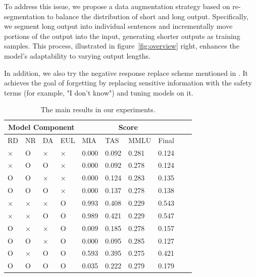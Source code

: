 \documentclass[11pt]{article}
\begin{document}

To address this issue, we propose a data augmentation strategy based on re-segmentation to balance the distribution of short and long output. Specifically, we segment long output into individual sentences and incrementally move portions of the output into the input, generating shorter outputs as training samples. This process, illustrated in figure~\ref{fig:overview} right, enhances the model's adaptability to varying output lengths.

In addition, we also try the negative response replace scheme mentioned in \cite{tofu2024}. It achieves the goal of forgetting by replacing sensitive information with the safety terms (for example, "I don't know") and tuning models on it.

\begin{table}[!t]
  \centering
    \begin{tabular}{llll|llllll}
    \hline
    \multicolumn{4}{c}{\textbf{Model Component}} & \multicolumn{4}{c}{\textbf{Score}} \\ \hline
         RD & NR & DA & EUL & MIA & TAS & MMLU & Final \\ \hline
         × & O & × & × & 0.000 & 0.092 & 0.281 & 0.124 \\ \hline
         × & O & O & × & 0.000 & 0.092 & 0.278 & 0.124 \\ \hline
         O & O & × & × & 0.000 & 0.124 & 0.283 & 0.135 \\ \hline
         O & O & O & × & 0.000 & 0.137 & 0.278 & 0.138 \\ \hline
         × & × & × & O & 0.993 & 0.408 & 0.229 & 0.543 \\ \hline
         × & × & O & O & 0.989 & 0.421 & 0.229 & 0.547 \\ \hline
         O & × & × & O & 0.009 & 0.185 & 0.278 & 0.157 \\ \hline
         O & O & × & O & 0.000 & 0.095 & 0.285 & 0.127 \\ \hline
         O & × & O & O & 0.593 & 0.395 & 0.275 & 0.421 \\ \hline
         O & O & O & O & 0.035 & 0.222 & 0.279 & 0.179 \\ \hline
    \end{tabular}
  \caption{
    The main results in our experiments.
  }
  \label{tab:AS2}
\end{table}
\end{document}
